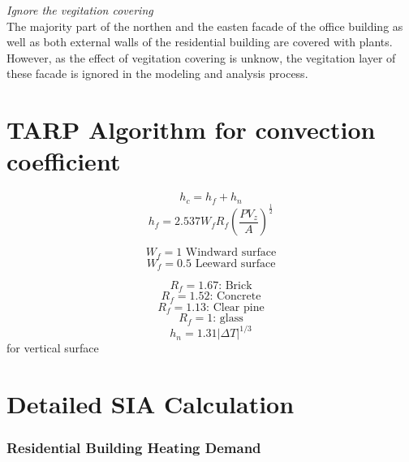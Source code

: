 \documentclass[a4paper, oneside]{discothesis}
\begin{document}
	\textit{Ignore the vegitation covering}\\
	The majority part of the northen and the easten facade of the office building as well as both external walls of the residential building are covered with plants. However, as the effect of vegitation covering is unknow, the vegitation layer of these facade is ignored in the modeling and analysis process.\\


\chapter{TARP Algorithm for convection coefficient}
\[h_c = h_f + h_n\]
\[h_f = 2.537 W_f R_f \left(\frac{PV_z}{A}\right)^\frac{1}{2}\]


\[W_f = 1  \text{   Windward surface}\]
\[W_f = 0.5 \text{   Leeward surface}\]

\[R_f = 1.67 \text{: Brick}\]
\[R_f = 1.52 \text{: Concrete}\]
\[R_f = 1.13 \text{: Clear pine}\]
\[R_f = 1 \text{: glass}\]
\[h_n = 1.31 | \Delta T|^{1/3}\]
for vertical surface


\chapter{Detailed SIA Calculation}	
	\subsection{Residential Building Heating Demand}
		
\end{document}
